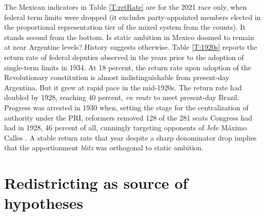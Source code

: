 \documentclass[letter,12pt]{article}
\begin{document}
The Mexican indicators in Table \ref{T:retRate} are for the 2021 race only, when federal term limits were dropped (it excludes party-appointed members elected in the proportional representation tier of the mixed system from the counts). It stands second from the bottom. Is static ambition in Mexico doomed to remain at near Argentine levels? History suggests otherwise. Table \ref{T:1920s} reports the return rate of federal deputies observed in the years prior to the adoption of single-term limits in 1934. At 18 percent, the return rate upon adoption of the Revolutionary constitution is almost indistinguishable from present-day Argentina. But it grew at rapid pace in the mid-1920s. The return rate had doubled by 1928, reaching 40 percent, \emph{en route} to meet present-day Brazil. Progress was arrested in 1930 when, setting the stage for the centralization of authority under the PRI, reformers removed 128 of the 281 seats Congress had had in 1928, 46 percent of all, cunningly targeting opponents of Jefe Máximo Calles \citep[see][:23]{godoy.reeleccion.2014}. A stable return rate that year despite a sharp denominator drop implies that the apportionment \emph{blitz} was orthogonal to static ambition.



\section{Redistricting as source of hypotheses}
\end{document}

